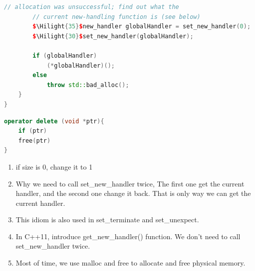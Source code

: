 \documentclass[a4paper,12pt,twoside]{book}
\newcommand{\Hilight}[1]{\makebox[0pt][l]{\color{yellow}\rule[-3pt]{#1em}{11pt}}}
\begin{document}
\begin{itemize}
\begin{lstlisting}[frame=single, language=c++]
		// allocation was unsuccessful; find out what the
		// current new-handling function is (see below)
		$\Hilight{35}$new_handler globalHandler = set_new_handler(0);
		$\Hilight{30}$set_new_handler(globalHandler);
		
		if (globalHandler) 
			(*globalHandler)();
		else 
			throw std::bad_alloc();
	}
}
	\end{lstlisting}
	
\begin{lstlisting}[frame=single, language=c++]
operator delete (void *ptr){
	if (ptr)
	free(ptr)
}
\end{lstlisting}
	\begin{enumerate}
		\item if size is 0, change it to 1
		\item Why we need to call set\_new\_handler twice, The first one get the current handler, and the second one change it back. That is only way we can get the current handler.
		
		\item This idiom is also used in set\_terminate and set\_unexpect. 
		
		\item In C++11, introduce get\_new\_handler() function. We don't need to call set\_new\_handler twice. 
		
		\item Most of time, we use malloc and free to allocate and free physical memory.
	\end{enumerate}
\end{itemize}
\end{document}
